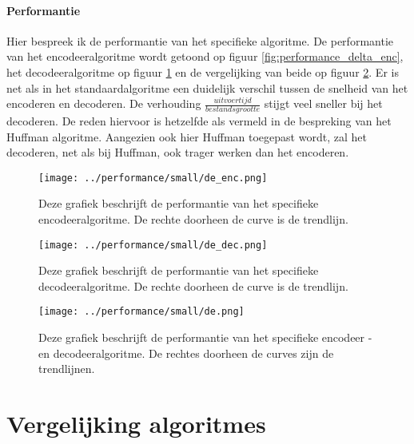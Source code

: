 \documentclass[11pt, a4paper]{article}
\begin{document}
\paragraph{Performantie}
Hier bespreek ik de performantie van het specifieke algoritme. De performantie van het encodeeralgoritme wordt getoond op figuur \ref{fig:performance_delta_enc}, het decodeeralgoritme op figuur \ref{fig:performance_delta_dec} en de vergelijking van beide op figuur \ref{fig:performance_delta}.
Er is net als in het standaardalgoritme een duidelijk verschil tussen de snelheid van het encoderen en decoderen. De verhouding $\frac{uitvoertijd}{bestandsgrootte}$ stijgt veel sneller bij het decoderen. De reden hiervoor is hetzelfde als vermeld in de bespreking van het Huffman algoritme. Aangezien ook hier Huffman toegepast wordt, zal het decoderen, net als bij Huffman, ook trager werken dan het encoderen. 
\begin{figure}
	\begin{center}
		\texttt{[image: ../performance/small/de\_enc.png]}
	\end{center}
	\caption{Deze grafiek beschrijft de performantie van het specifieke encodeeralgoritme. De rechte doorheen de curve is de trendlijn.}
	\label{fig:performance_delta_enc}
	\begin{center}
		\texttt{[image: ../performance/small/de\_dec.png]}
	\end{center}
	\caption{Deze grafiek beschrijft de performantie van het specifieke decodeeralgoritme. De rechte doorheen de curve is de trendlijn.}
	\label{fig:performance_delta_dec}
\end{figure}
\begin{figure}
	\begin{center}
		\texttt{[image: ../performance/small/de.png]}
	\end{center}
	\caption{Deze grafiek beschrijft de performantie van het specifieke encodeer - en decodeeralgoritme. De rechtes doorheen de curves zijn de trendlijnen.}
	\label{fig:performance_delta}
\end{figure}
\section{Vergelijking algoritmes}
\end{document}
